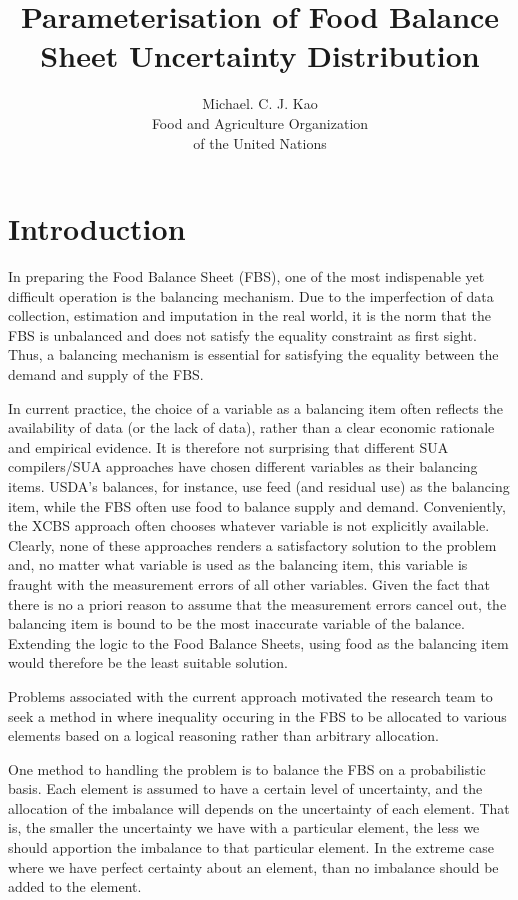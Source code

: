 \documentclass[nojss]{jss}\usepackage[]{graphicx}\usepackage[]{color}
\title{\bf Parameterisation of Food Balance Sheet Uncertainty Distribution}
\author{Michael. C. J. Kao\\ Food and Agriculture Organization \\ of
  the United Nations}
\begin{document}
\section{Introduction}

In preparing the Food Balance Sheet (FBS), one of the most
indispenable yet difficult operation is the balancing mechanism. Due
to the imperfection of data collection, estimation and imputation in
the real world, it is the norm that the FBS is unbalanced and does not
satisfy the equality constraint as first sight. Thus, a balancing
mechanism is essential for satisfying the equality between the demand
and supply of the FBS.


In current practice, the choice of a variable as a balancing item
often reflects the availability of data (or the lack of data), rather
than a clear economic rationale and empirical evidence. It is
therefore not surprising that different SUA compilers/SUA approaches
have chosen different variables as their balancing items. USDA's
balances, for instance, use feed (and residual use) as the balancing
item, while the FBS often use food to balance supply and
demand. Conveniently, the XCBS approach often chooses whatever
variable is not explicitly available. Clearly, none of these
approaches renders a satisfactory solution to the problem and, no
matter what variable is used as the balancing item, this variable is
fraught with the measurement errors of all other variables. Given the
fact that there is no a priori reason to assume that the measurement
errors cancel out, the balancing item is bound to be the most
inaccurate variable of the balance.  Extending the logic to the Food
Balance Sheets, using food as the balancing item would therefore be
the least suitable solution.

Problems associated with the current approach motivated the research
team to seek a method in where inequality occuring in the FBS to be
allocated to various elements based on a logical reasoning rather than
arbitrary allocation.

One method to handling the problem is to balance the FBS on a
probabilistic basis. Each element is assumed to have a certain level
of uncertainty, and the allocation of the imbalance will depends on
the uncertainty of each element. That is, the smaller the uncertainty
we have with a particular element, the less we should apportion the
imbalance to that particular element. In the extreme case where we
have perfect certainty about an element, than no imbalance should be
added to the element.
\end{document}
